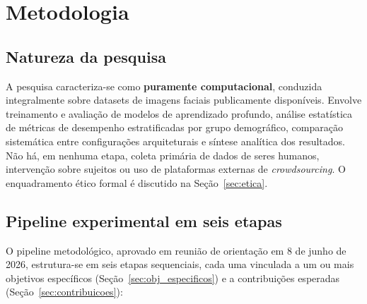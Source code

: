 \section{Metodologia}
\label{sec:metodologia}

\subsection{Natureza da pesquisa}
\label{sec:natureza}

A pesquisa caracteriza-se como \textbf{puramente computacional}, conduzida integralmente sobre datasets de imagens faciais publicamente disponíveis. Envolve treinamento e avaliação de modelos de aprendizado profundo, análise estatística de métricas de desempenho estratificadas por grupo demográfico, comparação sistemática entre configurações arquiteturais e síntese analítica dos resultados. Não há, em nenhuma etapa, coleta primária de dados de seres humanos, intervenção sobre sujeitos ou uso de plataformas externas de \emph{crowdsourcing}. O enquadramento ético formal é discutido na Seção~\ref{sec:etica}.

\subsection{Pipeline experimental em seis etapas}
\label{sec:pipeline}

O pipeline metodológico, aprovado em reunião de orientação em 8 de junho de 2026, estrutura-se em seis etapas sequenciais, cada uma vinculada a um ou mais objetivos específicos (Seção~\ref{sec:obj_especificos}) e a contribuições esperadas (Seção~\ref{sec:contribuicoes}):

